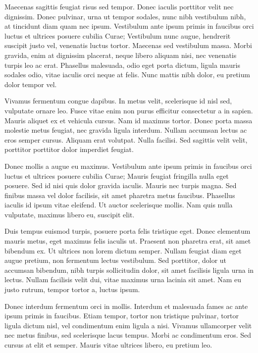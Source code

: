 \documentclass[12pt, letterpaper,twocolumn]{article}
\begin{document}
Maecenas sagittis feugiat risus sed tempor. Donec iaculis porttitor velit nec dignissim. Donec pulvinar, urna ut tempor sodales, nunc nibh vestibulum nibh, at tincidunt diam quam nec ipsum. Vestibulum ante ipsum primis in faucibus orci luctus et ultrices posuere cubilia Curae; Vestibulum nunc augue, hendrerit suscipit justo vel, venenatis luctus tortor. Maecenas sed vestibulum massa. Morbi gravida, enim at dignissim placerat, neque libero aliquam nisi, nec venenatis turpis leo ac erat. Phasellus malesuada, odio eget porta dictum, ligula mauris sodales odio, vitae iaculis orci neque at felis. Nunc mattis nibh dolor, eu pretium dolor tempor vel.

Vivamus fermentum congue dapibus. In metus velit, scelerisque id nisl sed, vulputate ornare leo. Fusce vitae enim non purus efficitur consectetur a in sapien. Mauris aliquet ex et vehicula cursus. Nam id maximus tortor. Donec porta massa molestie metus feugiat, nec gravida ligula interdum. Nullam accumsan lectus ac eros semper cursus. Aliquam erat volutpat. Nulla facilisi. Sed sagittis velit velit, porttitor porttitor dolor imperdiet feugiat.

Donec mollis a augue eu maximus. Vestibulum ante ipsum primis in faucibus orci luctus et ultrices posuere cubilia Curae; Mauris feugiat fringilla nulla eget posuere. Sed id nisi quis dolor gravida iaculis. Mauris nec turpis magna. Sed finibus massa vel dolor facilisis, sit amet pharetra metus faucibus. Phasellus iaculis id ipsum vitae eleifend. Ut auctor scelerisque mollis. Nam quis nulla vulputate, maximus libero eu, suscipit elit.

Duis tempus euismod turpis, posuere porta felis tristique eget. Donec elementum mauris metus, eget maximus felis iaculis ut. Praesent non pharetra erat, sit amet bibendum ex. Ut ultrices non lorem dictum semper. Nullam feugiat diam eget augue pretium, non fermentum lectus vestibulum. Sed porttitor, dolor ut accumsan bibendum, nibh turpis sollicitudin dolor, sit amet facilisis ligula urna in lectus. Nullam facilisis velit dui, vitae maximus urna lacinia sit amet. Nam eu justo rutrum, tempor tortor a, luctus ipsum.

Donec interdum fermentum orci in mollis. Interdum et malesuada fames ac ante ipsum primis in faucibus. Etiam tempor, tortor non tristique pulvinar, tortor ligula dictum nisl, vel condimentum enim ligula a nisi. Vivamus ullamcorper velit nec metus finibus, sed scelerisque lacus tempus. Morbi ac condimentum eros. Sed cursus at elit et semper. Mauris vitae ultrices libero, eu pretium leo.
\end{document}
